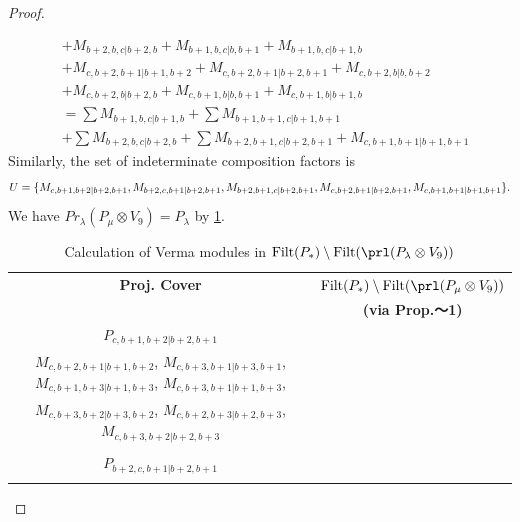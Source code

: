 \begin{proof}
\begin{enumerate}
\begin{enumerate}
\begin{equation}
\begin{aligned}
                                              &
+ M_{b+2,b,c|b+2,b}
+ M_{b+1,b,c|b,b+1}
+ M_{b+1,b,c|b+1,b}\\
                                              &
+ M_{c,b+2,b+1|b+1,b+2}
+ M_{c,b+2,b+1|b+2,b+1}
+ M_{c,b+2,b|b,b+2}\\
                                              &
+ M_{c,b+2,b|b+2,b}
+ M_{c,b+1,b|b,b+1}
+ M_{c,b+1,b|b+1,b} \\
                                               &=
\sum M_{b+1,b,c|b+1,b}
+ \sum M_{b+1,b+1,c|b+1,b+1}\\
                                              &
+ \sum M_{b+2,b,c|b+2,b}
+ \sum M_{b+2,b+1,c|b+2,b+1}
+  M_{c,b+1,b+1|b+1,b+1}
          \end{aligned}
        \end{equation}
      Similarly, the set of indeterminate composition factors is 
\begin{equation}\notag
  \begin{aligned}
     U = \{
M_{c,b+1,b+2|b+2,b+1},
M_{b+2,c,b+1|b+2,b+1},
M_{b+2,b+1,c|b+2,b+1},
M_{c,b+2,b+1|b+2,b+1},
M_{c,b+1,b+1|b+1,b+1}
\}.
  \end{aligned}
\end{equation}
      We have $Pr_{\lambda}(P_\mu \otimes V_{9}) = P_\lambda  $ by \cref{tab:verma-analysis_c_8}.
\begin{table}[htbp]
\centering
\caption{Calculation of Verma modules in $\operatorname{Filt}(P_*) \setminus \operatorname{Filt}(\prl(P_\lambda \otimes V_{9})) $ } \label{tab:verma-analysis_c_8}
\begin{tabular}{cc}
\toprule
\textbf{Proj. Cover} & \textbf{$\operatorname{Filt}(P_*) \setminus \operatorname{Filt}(\prl(P_\mu \otimes V_{9})) $}  \\
     & \textbf{(via Prop.～1)}  \\
\midrule
 $P_{c,b+1,b+2|b+2,b+1}$ & \makecell{
 $M_{c,b+2,b+2|b+2,b+2}$,
 $M_{c,b+1,b+3|b+3,b+1}$,
 $M_{c,b+2,b+3|b+3,b+2}$,
 $M_{c,b+1,b+2|b+1,b+2}$, \\
 $M_{c,b+2,b+1|b+1,b+2}$,
 $M_{c,b+3,b+1|b+3,b+1}$,
 $M_{c,b+1,b+3|b+1,b+3}$,
 $M_{c,b+3,b+1|b+1,b+3}$, \\
 $M_{c,b+3,b+2|b+3,b+2}$,
 $M_{c,b+2,b+3|b+2,b+3}$,
 $M_{c,b+3,b+2|b+2,b+3}$
}\\
 & \\
 $P_{b+2,c,b+1|b+2,b+1}$ & \makecell{
 $M_{b+3,c,b+1|b+3,b+1}$,
 $M_{b+2,c,b+2|b+2,b+2}$,
 $M_{b+3,c,b+2|b+3,b+2}$,
 $M_{b+3,c,b+2|b+2,b+3}$, \\
}
\end{tabular}
\end{table}
\end{enumerate}
\end{enumerate}
\end{proof}
